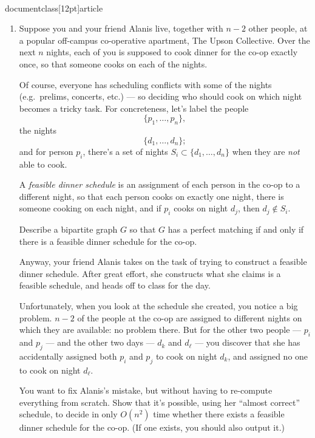 \\documentclass[12pt]{article}
\begin{document}
\begin{enumerate}
{}


\item 

Suppose you and your friend Alanis live, together with $n-2$
other people, at a popular off-campus co-operative apartment,
The Upson Collective.
Over the next $n$ nights, each of you is supposed to cook
dinner for the co-op exactly once, so that someone
cooks on each of the nights.

Of course, everyone has scheduling conflicts with some of
the nights (e.g.~prelims, concerts, etc.) ---
so deciding who should cook on which night becomes a tricky task.
For concreteness, let's label the people
$$\{p_1, \ldots, p_n\},$$
the nights
$$\{d_1, \ldots, d_n\};$$
and for person $p_i$, there's a set of nights
$S_i \subset \{d_1, \ldots, d_n\}$
when they are {\em not} able to cook.

A {\em feasible dinner schedule} is an assignment of each
person in the co-op to a different night, so that
each person cooks on exactly one night,
there is someone cooking on each night,
and if $p_i$ cooks on night $d_j$, then $d_j \not\in S_i$.

Describe a bipartite graph $G$ so that $G$ has
a perfect matching if and only if there is
a feasible dinner schedule for the co-op.

Anyway, your friend Alanis takes on the task of trying to
construct a feasible dinner schedule.
After great effort, she constructs what she claims
is a feasible schedule, and heads off to class for the day.

Unfortunately, when you look at the schedule she created,
you notice a big problem.
$n-2$ of the people at the co-op are assigned to
different nights on which they are available: no problem there.
But for the other two people
--- $p_i$ and $p_j$ ---
and the other two days
--- $d_k$ and $d_\ell$ ---
you discover that she has accidentally
assigned both $p_i$ and $p_j$ to cook on night $d_k$,
and assigned no one to cook on night $d_\ell$.

You want to fix Alanis's mistake, but without having
to re-compute everything from scratch.
Show that it's possible, using her ``almost correct'' schedule,
to decide in only $O(n^2)$ time
whether there exists a feasible dinner schedule for the co-op.
(If one exists, you should also output it.)



\end{enumerate}
\end{document}
